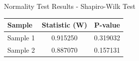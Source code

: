 
\begin{frame}{Normality Test Results - Shapiro-Wilk Test}
\centering
\begin{tabular}{l S[table-format=1.6] S[table-format=1.6]}
\toprule
\textbf{Sample} & \textbf{Statistic (W)} & \textbf{P-value} \\
\midrule
Sample 1 & 0.915250 & 0.319032 \\
Sample 2 & 0.887070 & 0.157131 \\
\bottomrule
\end{tabular}

\end{frame}
